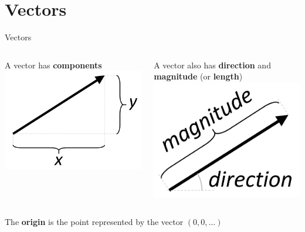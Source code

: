 \part{Vectors}
\frame{\partpage}

\begin{frame}{Vectors}
	\begin{columns}
		\begin{column}{0.48\textwidth}
			\pause A vector has \textbf{components}
			\pause \includegraphics[width=\textwidth]{vector_components}
		\end{column}
		\begin{column}{0.48\textwidth}
			\pause A vector also has \textbf{direction} and \textbf{magnitude} (or \textbf{length})
			\pause \includegraphics[width=\textwidth]{vector_polar}
		\end{column}
	\end{columns}
	\pause The \textbf{origin} is the point represented by the vector $(0, 0, \dots)$
\end{frame}

